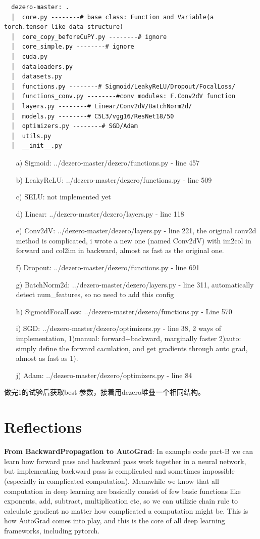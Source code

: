 \documentclass{article}
\newcommand{\secs}[1]{\section*{#1}}
\begin{document}
\begin{verbatim}
  dezero-master: .
  │  core.py --------# base class: Function and Variable(a torch.tensor like data structure)
  │  core_copy_beforeCuPY.py --------# ignore 
  │  core_simple.py --------# ignore
  │  cuda.py
  │  dataloaders.py
  │  datasets.py
  │  functions.py --------# Sigmoid/LeakyReLU/Dropout/FocalLoss/
  │  functions_conv.py --------#conv modules: F.Conv2dV function
  │  layers.py --------# Linear/Conv2dV/BatchNorm2d/
  │  models.py --------# C5L3/vgg16/ResNet18/50
  │  optimizers.py --------# SGD/Adam
  │  utils.py
  │  __init__.py
\end{verbatim}

\begin{itemize}
  \item[a)] Sigmoid: ../dezero-master/dezero/functions.py - line 457
  \item[b)] LeakyReLU: ../dezero-master/dezero/functions.py - line 509
  \item[c)] SELU: not implemented yet
  \item[d)] Linear: ../dezero-master/dezero/layers.py - line 118
  \item[e)] Conv2dV: ../dezero-master/dezero/layers.py - line 221, the original conv2d method is complicated, i wrote a new one (named Conv2dV) with im2col in forward and col2im in backward, almost as fast as the original one.
  \item[f)] Dropout: ../dezero-master/dezero/functions.py - line 691
  \item[g)] BatchNorm2d: ../dezero-master/dezero/layers.py - line 311, automatically detect num\_features, so no need to add this config
  \item[h)] SigmoidFocalLoss: ../dezero-master/dezero/functions.py - Line 570
  \item[i)] SGD: ../dezero-master/dezero/optimizers.py - line 38, 2 ways of implementation, 1)manual: forward+backward, marginally faster 2)auto: simply define the forward caculation, and get gradients through auto grad, almost as fast as 1).
  \item[j)] Adam: ../dezero-master/dezero/optimizers.py - line 84   
\end{itemize}


做完1的试验后获取best 参数，接着用dezero堆叠一个相同结构。



\secs{Reflections}
\noindent\textbf{From BackwardPropagation to AutoGrad}: In example code part-B we can learn how forward pass and backward pass work together in a neural network, but implementing backward pass is complicated and sometimes impossible (especially in complicated computation). Meanwhile we know that all computation in deep learning are basically consist of few basic functions like exponents, add, subtract, multiplication etc, so we can utilizie chain rule to calculate gradient no matter how complicated a computation might be. This is how AutoGrad comes into play, and this is the core of  all deep learning frameworks, including pytorch.\\
\end{document}
